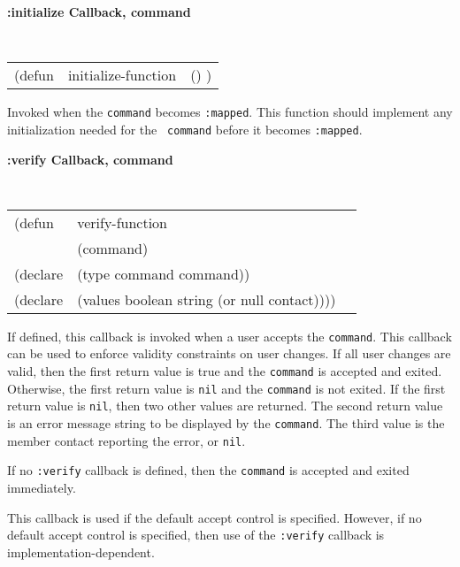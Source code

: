 {\samepage
{\large {\bf :initialize \hfill Callback, command}} 
\begin{flushright} 
\parbox[t]{6.125in}{
\tt
\begin{tabular}{lll}
\raggedright
(defun & initialize-function & () )
\end{tabular}
\rm

}\end{flushright}}

\begin{flushright} \parbox[t]{6.125in}{
Invoked when the {\tt command} becomes {\tt :mapped}.
This function should implement any initialization needed for the {\tt
command} before it becomes {\tt :mapped}.
}\end{flushright}


{\samepage
{\large {\bf :verify \hfill Callback, command}} 
\begin{flushright} 
\parbox[t]{6.125in}{
\tt
\begin{tabular}{lll}
\raggedright
(defun & verify-function \\
& (command)\\
(declare & (type  command  command))\\
(declare & (values   boolean string (or null contact))))
\end{tabular}
\rm

}\end{flushright}}

\begin{flushright} \parbox[t]{6.125in}{ If defined, this callback is invoked
when a user accepts the {\tt command}.  This callback can be used to
enforce validity constraints on user changes.  If all user changes are valid,
then the first return value is true and the {\tt command} is accepted and
exited.  Otherwise, the first return value is {\tt nil} and the {\tt command} is
not exited. If the first return value is {\tt nil}, then two other values are
returned. The second return value is an error message string to be displayed by
the {\tt command}. The third value is the member contact reporting the error, or
{\tt nil}.
}\end{flushright}

\begin{flushright} \parbox[t]{6.125in}{ If no {\tt :verify} callback is defined,
then the {\tt command} is accepted and exited
immediately.

This callback is used if the default accept control is specified. However, if no
default accept control is specified, then use of the {\tt :verify} callback is
implementation-dependent.
}\end{flushright}

